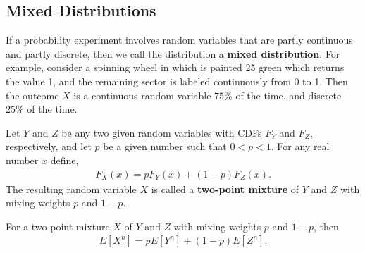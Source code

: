 \documentclass{article}
\numberwithin{theorem}{subsection}
\numberwithin{theorem}{subsubsection}
\numberwithin{lemma}{subsection}
\numberwithin{lemma}{subsubsection}
\theoremstyle{definition}
\numberwithin{definition}{subsection}
\numberwithin{definition}{subsubsection}
\begin{document}
\subsection{Mixed Distributions}
If a probability experiment involves random variables that are partly continuous and partly discrete, then we call the distribution a \textbf{mixed distribution}. For example, consider a spinning wheel in which is painted 25\text{\%} green which returns the value 1, and the remaining sector is labeled continuously from 0 to 1. Then the outcome $X$ is a continuous random variable $75\%$ of the time, and discrete $25\%$ of the time. \par
Let $Y$ and $Z$ be any two given random variables with CDFs $F_{Y}$ and $F_{Z}$, respectively, and let $p$ be a given number such that  $0 < p < 1$. For any real number $x$ define,
\begin{gather}
    F_{X}(x) = pF_{Y}(x) + (1-p)F_{Z}(x).
\end{gather}
The resulting random variable $X$ is called a \textbf{two-point mixture} of $Y$ and $Z$ with mixing weights $p$ and $1-p$.\par
For a two-point mixture $X$ of $Y$ and $Z$ with mixing weights $p$ and $1-p$, then
\begin{gather}
    E[X^n] = pE[Y^n] + (1-p)E[Z^n].
\end{gather}
\end{document}

